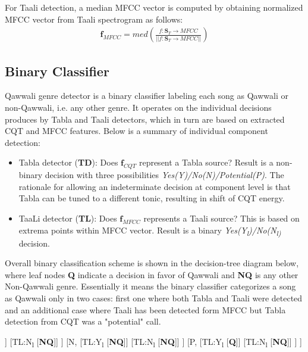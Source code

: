 \documentclass{article}
\begin{document}
For Taali detection, a median MFCC vector is computed by obtaining normalized MFCC vector from Taali spectrogram as follows:
\begin{align}\label{eq:eq7}
\boldsymbol{f}_{MFCC} = med(\frac{f\colon \boldsymbol{S}_{T}\to MFCC}{\lvert \lvert {f\colon \boldsymbol{S}_{T}\to MFCC} \rvert \rvert})
\end{align}

\subsection{Binary Classifier}

Qawwali genre detector is a binary classifier labeling each song as Qawwali or  non-Qawwali, i.e. any other genre. It operates on the individual decisions produces by Tabla and Taali detectors, which in turn are based on extracted CQT and MFCC features. Below is a summary of individual component detection:
\begin{itemize}
	\item Tabla detector (\textbf{TD}): Does $\boldsymbol{f}_{CQT}$ represent a Tabla source? Result is a non-binary decision with three possibilities \textit{Yes(Y)/No(N)/Potential(P)}. The rationale for allowing an indeterminate decision at component level is that Tabla can be tuned to a different tonic, resulting in shift of CQT energy.
	\item TaaLi detector (\textbf{TL}): Does $\boldsymbol{f}_{MFCC}$ represents a Taali source? This is based on extrema points within MFCC vector. Result is a binary \textit{Yes(Y\textsubscript{l})/No(N\textsubscript{l)}} decision.
\end{itemize}
Overall binary classification scheme is shown in the decision-tree diagram below, where leaf nodes \textbf{Q} indicate a decision in favor of Qawwali and \textbf{NQ} is any other Non-Qawwali genre. Essentially it means the binary classifier categorizes a song as Qawwali only in two cases: first one where both Tabla and Taali were detected and an additional case where Taali has been detected form MFCC but Tabla detection from CQT was a "potential" call. 

\begin{forest}
[TD,
	[Y,
		[TL:Y\textsubscript{l}
			[\textbf{Q}]]
		[TL:N\textsubscript{l}
			[\textbf{NQ}]]
	]
	[N,
		[TL:Y\textsubscript{l}
			[\textbf{NQ}]]
		[TL:N\textsubscript{l}
			[\textbf{NQ}]]
	]
	[P,
		[TL:Y\textsubscript{l}
			[\textbf{Q}]]
		[TL:N\textsubscript{l}
			[\textbf{NQ}]]
	]
]
\end{forest}
\end{document}
